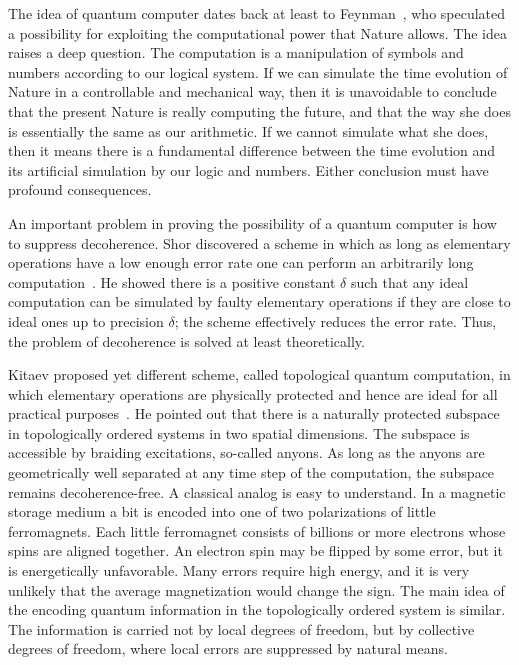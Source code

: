 
The idea of quantum computer dates back at least to Feynman~\cite{Feynman1982Simulating}, who speculated a possibility for exploiting the computational power that Nature allows. The idea raises a deep question. The computation is a manipulation of symbols and numbers according to our logical system. If we can simulate the time evolution of Nature in a controllable and mechanical way, then it is unavoidable to conclude that the present Nature is really computing the future, and that the way she does is essentially the same as our arithmetic. If we cannot simulate what she does, then it means there is a fundamental difference between the time evolution and its artificial simulation by our logic and numbers. Either conclusion must have profound consequences.



An important problem in proving the possibility of a quantum computer is how to suppress decoherence. Shor discovered a scheme in which as long as elementary operations have a low enough error rate one can perform an arbitrarily long computation~\cite{Shor1996Fault-tolerant}. He showed there is a positive constant $\delta$ such that any ideal computation can be simulated by faulty elementary operations if they are close to ideal ones up to precision $\delta$; the scheme effectively reduces the error rate. Thus, the problem of decoherence is solved at least theoretically. 



Kitaev proposed yet different scheme, called topological quantum computation, in which elementary operations are physically protected and hence are ideal for all practical purposes~\cite{Kitaev2003Fault-tolerant}. He pointed out that there is a naturally protected subspace in topologically ordered systems in two spatial dimensions. The subspace is accessible by braiding excitations, so-called anyons. As long as the anyons are geometrically well separated at any time step of the computation, the subspace remains decoherence-free. A classical analog is easy to understand. In a magnetic storage medium a bit is encoded into one of two polarizations of little ferromagnets. Each little ferromagnet consists of billions or more electrons whose spins are aligned together. An electron spin may be flipped by some error, but it is energetically unfavorable. Many errors require high energy, and it is very unlikely that the average magnetization would change the sign. The main idea of the encoding quantum information in the topologically ordered system is similar. The information is carried not by local degrees of freedom, but by collective degrees of freedom, where local errors are suppressed by natural means.



